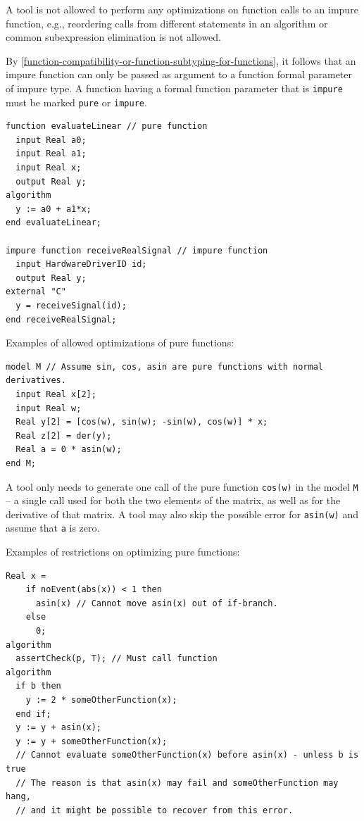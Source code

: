 \begin{nonnormative}
A tool is not allowed to perform any optimizations on function calls to an impure function, e.g., reordering calls from different statements in an algorithm or common subexpression elimination is not allowed.
\end{nonnormative}

By \cref{function-compatibility-or-function-subtyping-for-functions}, it follows that an impure function can only be passed as argument to a function formal parameter of impure type.
A function having a formal function parameter that is \lstinline!impure! must be marked \lstinline!pure! or \lstinline!impure!.

\begin{example}
\begin{lstlisting}[language=modelica]
function evaluateLinear // pure function
  input Real a0;
  input Real a1;
  input Real x;
  output Real y;
algorithm
  y := a0 + a1*x;
end evaluateLinear;

impure function receiveRealSignal // impure function
  input HardwareDriverID id;
  output Real y;
external "C"
  y = receiveSignal(id);
end receiveRealSignal;
\end{lstlisting}
Examples of allowed optimizations of pure functions:
\begin{lstlisting}[language=modelica]
model M // Assume sin, cos, asin are pure functions with normal derivatives.
  input Real x[2];
  input Real w;
  Real y[2] = [cos(w), sin(w); -sin(w), cos(w)] * x;
  Real z[2] = der(y);
  Real a = 0 * asin(w);
end M;
\end{lstlisting}
A tool only needs to generate one call of the pure function \lstinline!cos(w)! in the model \lstinline!M! -- a single call used for both the two elements of the matrix, as well as for the derivative of that matrix.
A tool may also skip the possible error for \lstinline!asin(w)! and assume that \lstinline!a! is zero.

Examples of restrictions on optimizing pure functions:
\begin{lstlisting}[language=modelica]
  Real x =
    if noEvent(abs(x)) < 1 then
      asin(x) // Cannot move asin(x) out of if-branch.
    else
      0;
algorithm
  assertCheck(p, T); // Must call function
algorithm
  if b then
    y := 2 * someOtherFunction(x);
  end if;
  y := y + asin(x);
  y := y + someOtherFunction(x);
  // Cannot evaluate someOtherFunction(x) before asin(x) - unless b is true
  // The reason is that asin(x) may fail and someOtherFunction may hang,
  // and it might be possible to recover from this error.
\end{lstlisting}
\end{example}

